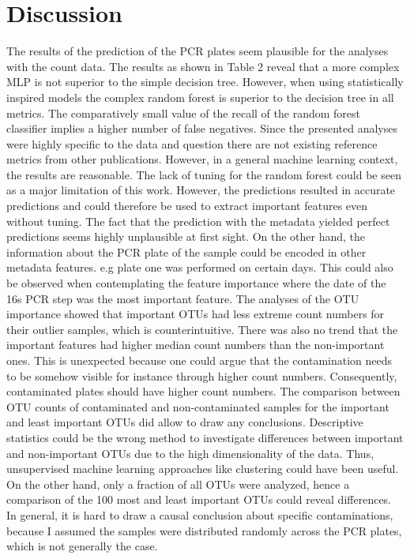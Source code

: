 \documentclass{svproc}
\begin{document}
\section{Discussion}
The results of the prediction of the PCR plates seem plausible for the analyses with the count data. The results as shown in Table 2 reveal that a more complex MLP is not superior to the simple decision tree. However, when using statistically inspired models the complex random forest is superior to the decision tree in all metrics. The comparatively small value of the recall of the random forest classifier implies a higher number of false negatives. Since the presented analyses were highly specific to the data and question there are not existing reference metrics from other publications. However, in a general machine learning context, the results are reasonable. The lack of tuning for the random forest could be seen as a major limitation of this work. However, the predictions resulted in accurate predictions and could therefore be used to extract important features even without tuning.
The fact that the prediction with the metadata yielded perfect predictions seems highly unplausible at first sight. On the other hand, the information about the PCR plate of the sample could be encoded in other metadata features. e.g plate one was performed on certain days. This could also be observed when contemplating the feature importance where the date of the 16s PCR step was the most important feature.
The analyses of the OTU importance showed that important OTUs had less extreme count numbers for their outlier samples, which is counterintuitive. There was also no trend that the important features had higher median count numbers than the non-important ones. This is unexpected because one could argue that the contamination needs to be somehow visible for instance through higher count numbers. Consequently, contaminated plates should have higher count numbers. The comparison between OTU counts of contaminated and non-contaminated samples for the important and least important OTUs did allow to draw any conclusions. Descriptive statistics could be the wrong method to investigate differences between important and non-important OTUs due to the high dimensionality of the data. Thus, unsupervised machine learning approaches like clustering could have been useful.
On the other hand, only a fraction of all OTUs were analyzed, hence a comparison of the 100 most and least important OTUs could reveal differences.
In general, it is hard to draw a causal conclusion about specific contaminations, because I assumed the samples were distributed randomly across the PCR plates, which is not generally the case.
\end{document}
